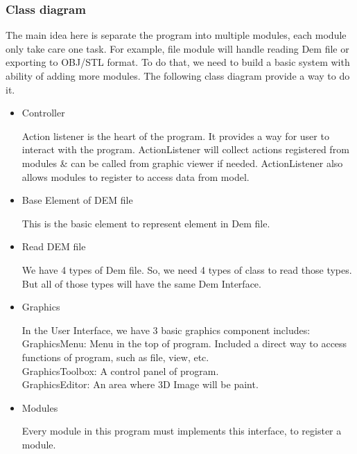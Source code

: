 \documentclass[11pt]{article}
\begin{document}
\subsubsection{Class diagram}
The main idea here is separate the program into multiple modules, each module only take care one task. For example, file module will handle reading Dem file or exporting to OBJ/STL format. To do that, we need to build a basic system with ability of adding more modules. The following class diagram provide a way to do it.
\begin{itemize}

\item Controller
\par\noindent{}
Action listener is the heart of the program. It provides a way for user to interact with the program. ActionListener will collect actions registered from modules \& can be called from graphic viewer if needed. ActionListener also allows modules to register to access data from model.

\item Base Element of DEM file
\par\noindent{}
This is the basic element to represent element in Dem file.

\item Read DEM file
\par\noindent{}
We have 4 types of Dem file. So, we need 4 types of class to read those types. But all of those types will have the same Dem Interface. 

\item Graphics 
\par\noindent{}
In the User Interface, we have 3 basic graphics component includes: 
\\GraphicsMenu: Menu in the top of program. Included a direct way to access functions of program, such as file, view, etc.
\\GraphicsToolbox: A control panel of program. 
\\GraphicsEditor: An area where 3D Image will be paint.
\item Modules
\par\noindent{}
Every module in this program must implements this interface, to register a module.
\end{itemize}
\end{document}
